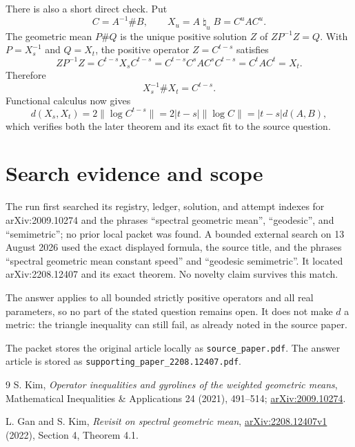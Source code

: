 \documentclass[11pt]{article}
\newcommand{\natmean}{\mathbin{\natural}}
\begin{document}
There is also a short direct check.  Put
\[
 C=A^{-1}\#B,\qquad X_u=A\natmean_uB=C^uAC^u.
\]
The geometric mean $P\#Q$ is the unique positive solution $Z$ of
$ZP^{-1}Z=Q$.  With $P=X_s^{-1}$ and $Q=X_t$, the positive operator
$Z=C^{t-s}$ satisfies
\[
 ZP^{-1}Z=C^{t-s}X_sC^{t-s}
 =C^{t-s}C^sAC^sC^{t-s}=C^tAC^t=X_t.
\]
Therefore
\[
 X_s^{-1}\#X_t=C^{t-s}.
\]
Functional calculus now gives
\[
 d(X_s,X_t)=2\|\log C^{t-s}\|
 =2|t-s|\|\log C\|=|t-s|d(A,B),
\]
which verifies both the later theorem and its exact fit to the source question.

\section*{Search evidence and scope}

The run first searched its registry, ledger, solution, and attempt indexes for
arXiv:2009.10274 and the phrases ``spectral geometric mean'', ``geodesic'', and
``semimetric''; no prior local packet was found.  A bounded external search on
13 August 2026 used the exact displayed formula, the source title, and the
phrases ``spectral geometric mean constant speed'' and ``geodesic semimetric''.
It located arXiv:2208.12407 and its exact theorem.  No novelty claim survives
this match.

The answer applies to all bounded strictly positive operators and all real
parameters, so no part of the stated question remains open.  It does not make
$d$ a metric: the triangle inequality can still fail, as already noted in the
source paper.

The packet stores the original article locally as \texttt{source\_paper.pdf}.
The answer article is stored as
\texttt{supporting\_paper\_}\allowbreak\texttt{2208.12407.pdf}.

\begin{thebibliography}{9}
S. Kim,
\emph{Operator inequalities and gyrolines of the weighted geometric means},
Mathematical Inequalities \& Applications 24 (2021), 491--514;
\href{https://arxiv.org/abs/2009.10274}{arXiv:2009.10274}.

L. Gan and S. Kim,
\emph{Revisit on spectral geometric mean},
\href{https://arxiv.org/abs/2208.12407}{arXiv:2208.12407v1} (2022),
Section 4, Theorem 4.1.
\end{thebibliography}
\end{document}
